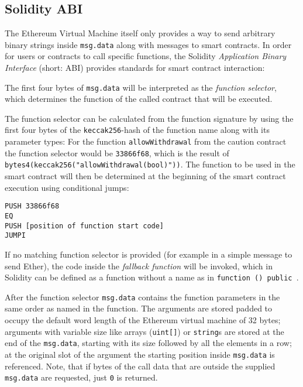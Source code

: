 \subsection{Solidity ABI}
\label{section:deepdive:abi}
The Ethereum Virtual Machine itself only provides a way to send arbitrary binary strings inside \texttt{msg.data} along with messages to smart contracts. In order for users or contracts to call specific functions, the Solidity \textit{Application Binary Interface} (short: ABI) provides standards for smart contract interaction:

The first four bytes of \texttt{msg.data} will be interpreted as the \textit{function selector}, which determines the function of the called contract that will be executed.

The function selector can be calculated from the function signature by using the first four bytes of the \texttt{keccak256}-hash of the function name along with its parameter types: For the function \texttt{allowWithdrawal} from the caution contract the function selector would be \texttt{33866f68}, which is the result of \texttt{bytes4(keccak256("allowWithdrawal(bool)"))}. The function to be used in the smart contract will then be determined at the beginning of the smart contract execution using conditional jumps:
\begin{verbatim}
PUSH 33866f68
EQ
PUSH [position of function start code]
JUMPI
\end{verbatim}

If no matching function selector is provided (for example in a simple message to send Ether), the code inside the \textit{fallback function} will be invoked, which in Solidity can be defined as a function without a name as in \texttt{function () public {}}.

After the function selector \texttt{msg.data} contains the function parameters in the same order as named in the function. The arguments are stored padded to occupy the default word length of the Ethereum virtual machine of 32 bytes; arguments with variable size like arrays (\texttt{uint[]}) or \texttt{string}s are stored at the end of the \texttt{msg.data}, starting with its size followed by all the elements in a row; at the original slot of the argument the starting position inside \texttt{msg.data} is referenced. Note, that if bytes of the call data that are outside the supplied \texttt{msg.data} are requested, just \texttt{0} is returned.

